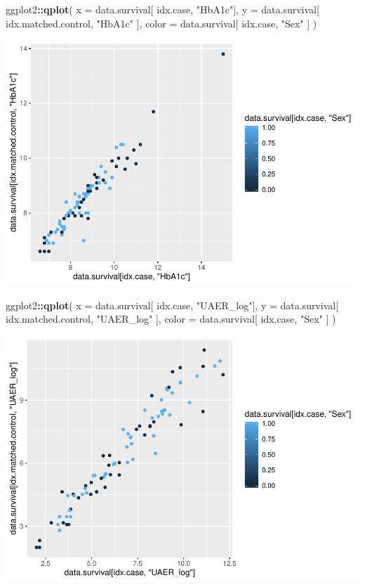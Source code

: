 \documentclass[]{article}
\newenvironment{Shaded}{\begin{snugshade}}{\end{snugshade}}
\newcommand{\DataTypeTok}[1]{\textcolor[rgb]{0.13,0.29,0.53}{#1}}
\newcommand{\KeywordTok}[1]{\textcolor[rgb]{0.13,0.29,0.53}{\textbf{#1}}}
\newcommand{\NormalTok}[1]{#1}
\newcommand{\OperatorTok}[1]{\textcolor[rgb]{0.81,0.36,0.00}{\textbf{#1}}}
\newcommand{\StringTok}[1]{\textcolor[rgb]{0.31,0.60,0.02}{#1}}
\begin{document}
\begin{Shaded}
\begin{Highlighting}[]
\NormalTok{ggplot2}\OperatorTok{::}\KeywordTok{qplot}\NormalTok{(}
  \DataTypeTok{x =}\NormalTok{ data.survival[ idx.case, }\StringTok{"HbA1c"}\NormalTok{], }
  \DataTypeTok{y =}\NormalTok{ data.survival[ idx.matched.control, }\StringTok{"HbA1c"}\NormalTok{ ], }
  \DataTypeTok{color =}\NormalTok{ data.survival[ idx.case, }\StringTok{"Sex"}\NormalTok{ ]}
\NormalTok{)}
\end{Highlighting}
\end{Shaded}

\includegraphics{0033_PROFIL--Metabolomics_files/figure-latex/Myo-I-Matched-Subset-2.pdf}

\begin{Shaded}
\begin{Highlighting}[]
\NormalTok{ggplot2}\OperatorTok{::}\KeywordTok{qplot}\NormalTok{(}
  \DataTypeTok{x =}\NormalTok{ data.survival[ idx.case, }\StringTok{"UAER_log"}\NormalTok{], }
  \DataTypeTok{y =}\NormalTok{ data.survival[ idx.matched.control, }\StringTok{"UAER_log"}\NormalTok{ ], }
  \DataTypeTok{color =}\NormalTok{ data.survival[ idx.case, }\StringTok{"Sex"}\NormalTok{ ]}
\NormalTok{)}
\end{Highlighting}
\end{Shaded}

\includegraphics{0033_PROFIL--Metabolomics_files/figure-latex/Myo-I-Matched-Subset-3.pdf}
\end{document}
